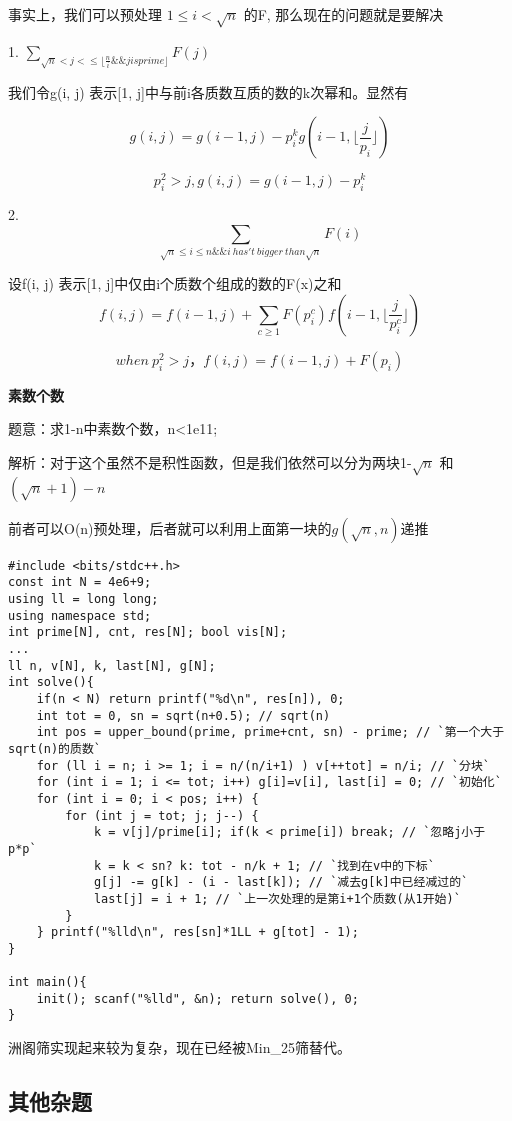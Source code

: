 事实上，我们可以预处理 $ 1 \le i < \sqrt{n} $ 的F, 那么现在的问题就是要解决

1. $\sum_{\sqrt{n} < j < \le \lfloor \frac{n}{i} \&\&j is prime\rfloor} F(j)$

我们令g(i, j) 表示[1, j]中与前i各质数互质的数的k次幂和。显然有

$$
g(i, j) = g(i-1, j)-p^k_ig(i-1, \lfloor \frac{j}{p_i}\rfloor)  $$

$$
p_i^2 >  j, g(i, j) = g(i-1, j) - p^k_i
$$

2. $$\sum_{\sqrt{n}  \le i \le n \&\& i \ has't \ bigger \ than \sqrt{n}}  F(i)$$

设f(i, j) 表示[1, j]中仅由i个质数个组成的数的F(x)之和
$$
f(i, j) = f(i-1, j) + \sum_{c \ge 1}F(p^c_i)f(i-1, \lfloor \frac{j}{p_i^c} \rfloor)
$$

$$
when\ p^2_i > j ， f(i, j) = f(i-1, j) + F(p_i)
$$


{\bfseries 素数个数}

题意：求1-n中素数个数，n<1e11;

解析：对于这个虽然不是积性函数，但是我们依然可以分为两块1-$\sqrt{n}$ 和$(\sqrt{n}+1 ) -  n$

前者可以O(n)预处理，后者就可以利用上面第一块的$g(\sqrt{n},n)$递推

\begin{lstlisting}
#include <bits/stdc++.h>
const int N = 4e6+9;
using ll = long long;
using namespace std;
int prime[N], cnt, res[N]; bool vis[N];
...
ll n, v[N], k, last[N], g[N];
int solve(){
    if(n < N) return printf("%d\n", res[n]), 0;
    int tot = 0, sn = sqrt(n+0.5); // sqrt(n)
    int pos = upper_bound(prime, prime+cnt, sn) - prime; // `第一个大于sqrt(n)的质数`
    for (ll i = n; i >= 1; i = n/(n/i+1) ) v[++tot] = n/i; // `分块`
    for (int i = 1; i <= tot; i++) g[i]=v[i], last[i] = 0; // `初始化`
    for (int i = 0; i < pos; i++) {
        for (int j = tot; j; j--) {
            k = v[j]/prime[i]; if(k < prime[i]) break; // `忽略j小于p*p`
            k = k < sn? k: tot - n/k + 1; // `找到在v中的下标`
            g[j] -= g[k] - (i - last[k]); // `减去g[k]中已经减过的`
            last[j] = i + 1; // `上一次处理的是第i+1个质数(从1开始)`
        }
    } printf("%lld\n", res[sn]*1LL + g[tot] - 1);
}

int main(){
    init(); scanf("%lld", &n); return solve(), 0;
}
\end{lstlisting}

洲阁筛实现起来较为复杂，现在已经被Min\_25筛替代。

\subsection{其他杂题}


